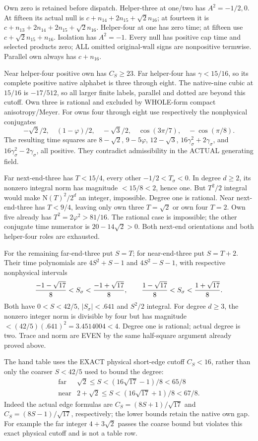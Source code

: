 Own zero is retained before dispatch.
Helper-three at one/two has \(A^2=-1/2,0\).
At fifteen its actual null is
\(c+n_{14}+2n_{15}+\sqrt2n_{16}\);
at fourteen it is
\(c+n_{13}+2n_{14}+2n_{15}+\sqrt2n_{16}\).
Helper-four at one has zero time;
at fifteen use \(c+\sqrt2n_{15}+n_{16}\).
Isolation has \(A^2=-1\).
Every null has positive cap time and selected
products zero; ALL omitted original-wall signs
are nonpositive termwise.
Parallel own always has \(c+n_{16}\).

Near helper-four positive own has \(C_S\ge23\).
Far helper-four has \(\gamma<15/16\), so its
complete positive native alphabet is
three through eight.
The native-nine cubic at \(15/16\) is
\(-17/512\), so all larger finite labels, parallel
and dotted are beyond this cutoff.
Own three is rational and excluded by WHOLE-form
compact anisotropy/Meyer.
For owns four through eight use respectively
the nonphysical conjugates
\[
 -\sqrt2/2,\quad(1-\varphi)/2,\quad-\sqrt3/2,\quad
 \cos(3\pi/7),\quad-\cos(\pi/8).
\]
The resulting time squares are
\(8-\sqrt2\), \(9-5\varphi\), \(12-\sqrt3\),
\(16\gamma_\sigma^2+2\gamma_\sigma\), and
\(16\gamma_\sigma^2-2\gamma_\sigma\), all positive.
They contradict admissibility in the ACTUAL
generating field.

Far next-end-three has
\(T<15/4\), every other \(-1/2<T_\sigma<0\).
In degree \(d\ge2\), its nonzero integral norm
has magnitude \(<15/8<2\), hence one.
But \(T^2/2\) integral would make
\(\mathrm N(T)^2/2^d\) an integer, impossible.
Degree one is rational.
Near next-end-three has \(T<9/4\), leaving only
own three \(T=\sqrt2\) or own four \(T=2\).
Own five already has \(T^2=2\varphi^2>81/16\).
The rational case is impossible; the other
conjugate time numerator is \(20-14\sqrt2>0\).
Both next-end orientations and both helper-four
roles are exhausted.

For the remaining far-end-three put \(S=T\);
for near-end-three put \(S=T+2\).
Their time polynomials are \(4S^2+S-1\) and
\(4S^2-S-1\), with respective nonphysical intervals
\[
 { -1-\sqrt{17}\over8}<S_\sigma<{ -1+\sqrt{17}\over8},
 \qquad
 {1-\sqrt{17}\over8}<S_\sigma<{1+\sqrt{17}\over8}.
\]
Both have \(0<S<42/5\), \(|S_\sigma|<.641\)
and \(S^2/2\) integral.
For degree \(d\ge3\), the nonzero integer norm
is divisible by four but has magnitude
\(<(42/5)(.641)^2=3.4514004<4\).
Degree one is rational; actual degree is two.
Trace and norm are EVEN by the same half-square
argument already proved above.

The hand table uses the EXACT physical short-edge
cutoff \(C_S<16\), rather than only the coarser
\(S<42/5\) used to bound the degree:
\[
\begin{array}{c|c}
 \text{far}&\sqrt2\le S<(16\sqrt{17}-1)/8<65/8\\
 \text{near}&2+\sqrt2\le S<(16\sqrt{17}+1)/8<67/8 .
\end{array}
\]
Indeed the actual edge formulas are
\(C_S=(8S+1)/\sqrt{17}\) and
\(C_S=(8S-1)/\sqrt{17}\), respectively;
the lower bounds retain the native own gap.
For example the far integer \(4+3\sqrt2\)
passes the coarse bound but violates this
exact physical cutoff and is not a table row.

